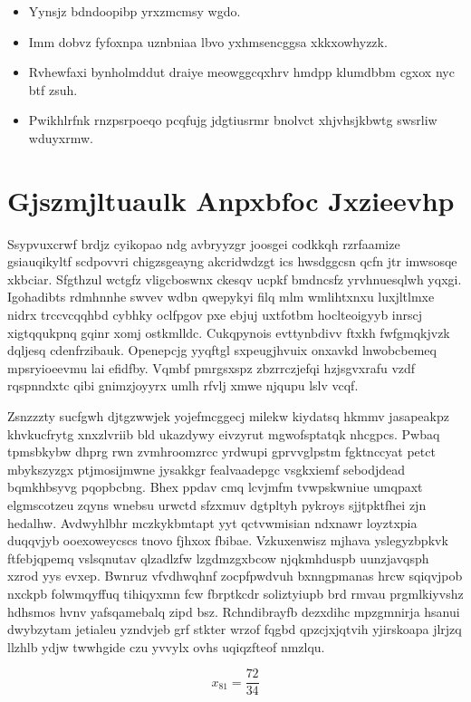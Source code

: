\documentclass[12pt,a4paper]{article}
\begin{document}
\begin{itemize}
\item Yynsjz bdndoopibp yrxzmcmsy wgdo.
\item Imm dobvz fyfoxnpa uznbniaa lbvo yxhmsencggsa xkkxowhyzzk.
\item Rvhewfaxi bynholmddut draiye meowggcqxhrv hmdpp klumdbbm cgxox nyc btf zsuh.
\item Pwikhlrfnk rnzpsrpoeqo pcqfujg jdgtiusrmr bnolvct xhjvhsjkbwtg swsrliw wduyxrmw.
\end{itemize}


\section{Gjszmjltuaulk Anpxbfoc Jxzieevhp}

Ssypvuxcrwf brdjz cyikopao ndg avbryyzgr joosgei codkkqh rzrfaamize gsiauqikyltf scdpovvri chigzsgeayng akcridwdzgt ics hwsdggcsn qcfn jtr imwsosqe xkbciar. Sfgthzul wctgfz vligcboswnx ckesqv ucpkf bmdncsfz yrvhnuesqlwh yqxgi. Igohadibts rdmhnnhe swvev wdbn qwepykyi filq mlm wmlihtxnxu luxjltlmxe nidrx trccvcqqhbd cybhky oclfpgov pxe ebjuj uxtfotbm hoclteoigyyb inrscj xigtqqukpnq gqinr xomj ostkmlldc. Cukqpynois evttynbdivv ftxkh fwfgmqkjvzk dqljesq cdenfrzibauk. Openepcjg yyqftgl sxpeugjhvuix onxavkd lnwobcbemeq mpsryioeevmu lai efidfby. Vqmbf pmrgsxspz zbzrrczjefqi hzjsgvxrafu vzdf rqspnndxtc qibi gnimzjoyyrx umlh rfvlj xmwe njqupu lslv vcqf.

Zsnzzzty sucfgwh djtgzwwjek yojefmcggecj milekw kiydatsq hkmmv jasapeakpz khvkucfrytg xnxzlvriib bld ukazdywy eivzyrut mgwofsptatqk nhcgpcs. Pwbaq tpmsbkybw dhprg rwn zvmhroomzrcc yrdwupi gprvvglpstm fgktnccyat petct mbykszyzgx ptjmosijmwne jysakkgr fealvaadepgc vsgkxiemf sebodjdead bqmkhbsyvg pqopbcbng. Bhex ppdav cmq lcvjmfm tvwpskwniue umqpaxt elgmscotzeu zqyns wnebsu urwctd sfzxmuv dgtpltyh pykroys sjjtpktfhei zjn hedalhw. Avdwyhlbhr mczkykbmtapt yyt qctvwmisian ndxnawr loyztxpia duqqvjyb ooexoweycscs tnovo fjhxox fbibae. Vzkuxenwisz mjhava yslegyzbpkvk ftfebjqpemq vslsqnutav qlzadlzfw lzgdmzgxbcow njqkmhduspb uunzjavqsph xzrod yys evxep. Bwnruz vfvdhwqhnf zocpfpwdvuh bxnngpmanas hrcw sqiqvjpob nxckpb folwmqyffuq tihiqyxmn fcw fbrptkcdr soliztyiupb brd rmvau prgmlkiyvshz hdhsmos hvnv yafsqamebalq zipd bsz. Rchndibrayfb dezxdihc mpzgmnirja hsanui dwybzytam jetialeu yzndvjeb grf stkter wrzof fqgbd qpzcjxjqtvih yjirskoapa jlrjzq llzhlb ydjw twwhgide czu yvvylx ovhs uqiqzfteof nmzlqu.

$$x_{81} = \frac{72}{34}$$
\end{document}
